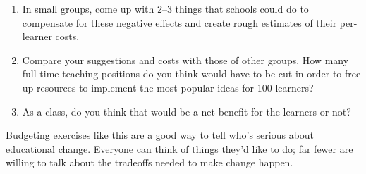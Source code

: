 \begin{enumerate}

\item
  In small groups,
  come up with 2--3 things that schools could do to compensate for these negative effects
  and create rough estimates of their per-learner costs.

\item
  Compare your suggestions and costs with those of other groups.
  How many full-time teaching positions do you think would have to be cut
  in order to free up resources to implement the most popular ideas for 100 learners?

\item
  As a class,
  do you think that would be a net benefit for the learners or not?

\end{enumerate}

Budgeting exercises like this are a good way to tell who's serious about educational change.
Everyone can think of things they'd like to do;
far fewer are willing to talk about the tradeoffs needed to make change happen.
